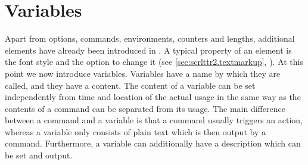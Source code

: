 \section{Variables}
\label{sec:scrlttr2.variables}%

Apart from options, commands, environments, counters and lengths,
additional elements have already been introduced in \KOMAScript.  A
typical property of an element is the font style and the option to
change it (see \autoref{sec:scrlttr2.textmarkup},
). At this point we now
introduce variables. Variables have a name by which they are called,
and they have a content. The content of a variable can be set
independently from time and location of the actual usage in the same
way as the contents of a command can be separated from its usage. The
main difference between a command and a variable is that a command
usually triggers an action, whereas a variable only consists of plain
text which is then output by a command. Furthermore, a variable can
additionally have a description which can be set and output.

